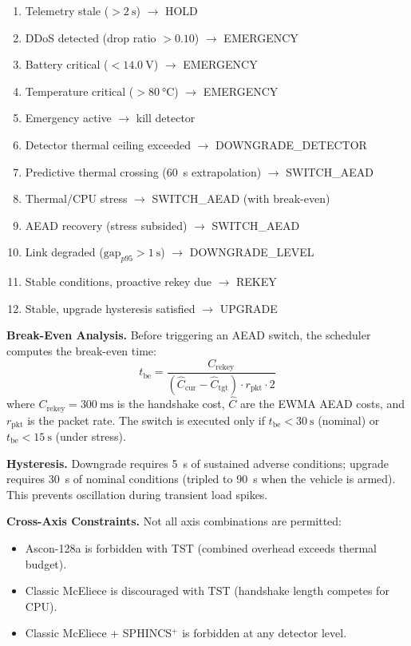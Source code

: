 \documentclass[conference]{IEEEtran}
\begin{document}
\begin{enumerate}[noitemsep, label=\arabic*.]
    \item Telemetry stale ($> \SI{2}{\second}$) $\to$ HOLD
    \item DDoS detected (drop ratio $> 0.10$) $\to$ EMERGENCY
    \item Battery critical ($< \SI{14.0}{\volt}$) $\to$ EMERGENCY
    \item Temperature critical ($> \SI{80}{\celsius}$) $\to$ EMERGENCY
    \item Emergency active $\to$ kill detector
    \item Detector thermal ceiling exceeded $\to$ DOWNGRADE\_DETECTOR
    \item Predictive thermal crossing (\SI{60}{\second} extrapolation) $\to$ SWITCH\_AEAD
    \item Thermal/CPU stress $\to$ SWITCH\_AEAD (with break-even)
    \item AEAD recovery (stress subsided) $\to$ SWITCH\_AEAD
    \item Link degraded ($\text{gap}_{p95} > \SI{1}{\second}$) $\to$ DOWNGRADE\_LEVEL
    \item Stable conditions, proactive rekey due $\to$ REKEY
    \item Stable, upgrade hysteresis satisfied $\to$ UPGRADE
\end{enumerate}

\textbf{Break-Even Analysis.}
Before triggering an AEAD switch, the scheduler computes the break-even time:
\begin{equation}
\label{eq:break-even}
    t_{\mathrm{be}} = \frac{C_{\mathrm{rekey}}}{(\hat{C}_{\mathrm{cur}} - \hat{C}_{\mathrm{tgt}}) \cdot r_{\mathrm{pkt}} \cdot 2}
\end{equation}
where $C_{\mathrm{rekey}} = \SI{300}{\milli\second}$ is the handshake cost, $\hat{C}$ are the EWMA AEAD costs, and $r_{\mathrm{pkt}}$ is the packet rate.
The switch is executed only if $t_{\mathrm{be}} < \SI{30}{\second}$ (nominal) or $t_{\mathrm{be}} < \SI{15}{\second}$ (under stress).

\textbf{Hysteresis.}
Downgrade requires \SI{5}{\second} of sustained adverse conditions; upgrade requires \SI{30}{\second} of nominal conditions (tripled to \SI{90}{\second} when the vehicle is armed).
This prevents oscillation during transient load spikes.

\textbf{Cross-Axis Constraints.}
Not all axis combinations are permitted:
\begin{itemize}[noitemsep]
    \item Ascon-128a is forbidden with TST (combined overhead exceeds thermal budget).
    \item Classic McEliece is discouraged with TST (handshake length competes for CPU).
    \item Classic McEliece + SPHINCS$^+$ is forbidden at any detector level.
\end{itemize}
\end{document}
